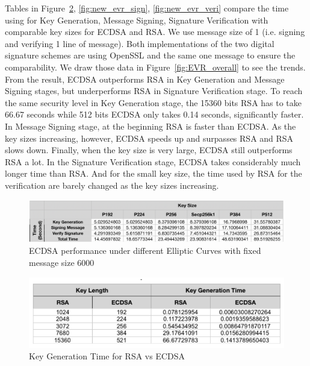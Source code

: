 \documentclass[10pt,sigconf]{acmart}
\begin{document}
Tables in Figure~\ref{fig:new_evr_gen}, \ref{fig:new_evr_sign}, \ref{fig:new_evr_veri} compare the time using for Key Generation, Message Signing, Signature Verification with comparable key sizes for ECDSA and RSA. We use message size of 1 (i.e. signing and verifying 1 line of message). Both implementations of the two digital signature schemes are using OpenSSL and the same one message to ensure the comparability. We draw those data in Figure~\ref{fig:EVR_overall} to see the trends. From the result, ECDSA outperforms RSA in Key Generation and Message Signing stages, but underperforms RSA in Signature Verification stage. To reach the same security level in Key Generation stage, the 15360 bits RSA has to take 66.67 seconds while 512 bits ECDSA only takes 0.14 seconds, significantly faster. In Message Signing stage, at the beginning RSA is faster than ECDSA. As the key sizes increasing, however, ECDSA speeds up and surpasses RSA and RSA slows down. Finally, when the key size is very large, ECDSA still outperforms RSA a lot. In the Signature Verification stage, ECDSA takes considerably much longer time than RSA. And for the small key size, the time used by RSA for the verification are barely changed as the key sizes increasing.

\begin{figure}
\centering
\includegraphics[scale=0.45]{ECDSA_Varying_Keysize_Runtime_Table}
\caption{\small{ECDSA performance under different Elliptic Curves with fixed message size 6000}}
\label{fig:ECDSA_Varying_Keysize_Runtime_Table}
\end{figure}

\begin{figure}[H]
\centering
\includegraphics[scale=0.62]{new_evr_gen}
\caption{\small{Key Generation Time for RSA vs ECDSA}}
\label{fig:new_evr_gen}
\end{figure}
\end{document}

